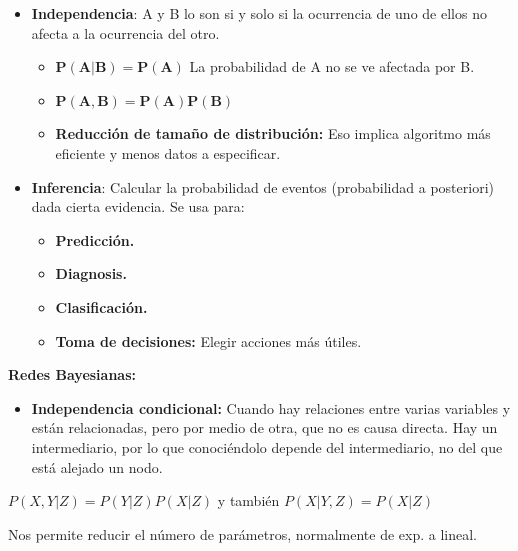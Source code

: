 \documentclass[12pt, twoside, openright]{report} %
\begin{document}
\begin{itemize}
\begin{itemize}
    \end{itemize}
  \item \textbf{Independencia}: A y B lo son si y solo si la ocurrencia de
    uno de ellos no afecta a la ocurrencia del otro.
    

    \begin{itemize}
    \item $\boldsymbol{P(A| B)=P(A)}$ La probabilidad de A no se ve
      afectada por B.
      
    \item $\boldsymbol{P(A, B)=P(A)P(B)}$
      
    \item \textbf{Reducción de tamaño de distribución:} Eso implica
      algoritmo más eficiente y menos datos a especificar.
      
    \end{itemize}
  \item \textbf{Inferencia}: Calcular la probabilidad de eventos
    (probabilidad a posteriori) dada cierta evidencia. Se usa para:
    

    \begin{itemize}
    \item \textbf{Predicción.}
      
    \item \textbf{Diagnosis.}
      
    \item \textbf{Clasificación.}
      
    \item \textbf{Toma de decisiones:} Elegir acciones más útiles.
      
    \end{itemize}
  \end{itemize}

 \pagebreak
  \textbf{Redes Bayesianas:}
  

  \begin{itemize}
  \item \textbf{Independencia condicional:} Cuando hay relaciones entre
    varias variables y están relacionadas, pero por medio de otra, que
    no es causa directa. Hay un intermediario, por lo que conociéndolo
    depende del intermediario, no del que está alejado un nodo.
    
  \end{itemize}

  
$P(X,Y| Z)=P(Y| Z)P(X| Z)$ y también $P(X| Y,Z)=P(X| Z)$

Nos permite reducir el número de parámetros, normalmente de exp. a
lineal.
\end{document}
